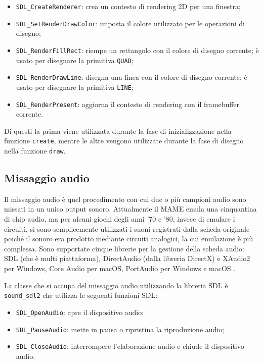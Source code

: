 \begin{itemize}	
	\item \verb|SDL_CreateRenderer|: crea un contesto di rendering 2D per una finestra;
	\item \verb|SDL_SetRenderDrawColor|: imposta il colore utilizzato per le operazioni di disegno;
	\item \verb|SDL_RenderFillRect|: riempe un rettangolo con il colore di disegno corrente; è usato per disegnare la primitiva \verb|QUAD|;
	\item \verb|SDL_RenderDrawLine|: disegna una linea con il colore di disegno corrente; è usato per disegnare la primitiva \verb|LINE|;
	\item \verb|SDL_RenderPresent|: aggiorna il contesto di rendering con il framebuffer corrente.
\end{itemize}

Di questi la prima viene utilizzata durante la fase di inizializzazione nella funzione \verb|create|, mentre le altre vengono utilizzate durante la fase di disegno nella funzione \verb|draw|.




\subsection{Missaggio audio} \label{subsec:cap2_MissaggioAudio}
Il missaggio audio è quel procedimento con cui due o più campioni audio sono missati in un unico output sonoro. Attualmente il MAME emula una cinquantina di chip audio, ma per alcuni giochi degli anni '70 e '80, invece di emulare i circuiti, si sono semplicemente utilizzati i suoni registrati dalla scheda originale poiché il sonoro era prodotto mediante circuiti analogici, la cui emulazione è più complessa. Sono supportate cinque librerie per la gestione della scheda audio: SDL (che è multi piattaforma), DirectAudio (dalla libreria DirectX) e XAudio2 per Windows, Core Audio per macOS, PortAudio per Windows e macOS \parencite{Il_progetto_MAME}.

La classe che si occupa del missaggio audio utilizzando la libreria SDL è \verb|sound_sdl2| che utilizza le seguenti funzioni SDL:

\begin{itemize}	
	\item \verb|SDL_OpenAudio|: apre il dispositivo audio;
	\item \verb|SDL_PauseAudio|: mette in pausa o ripristina la riproduzione audio;
	\item \verb|SDL_CloseAudio|: interrompere l'elaborazione audio e chiude il dispositivo audio.
\end{itemize}

